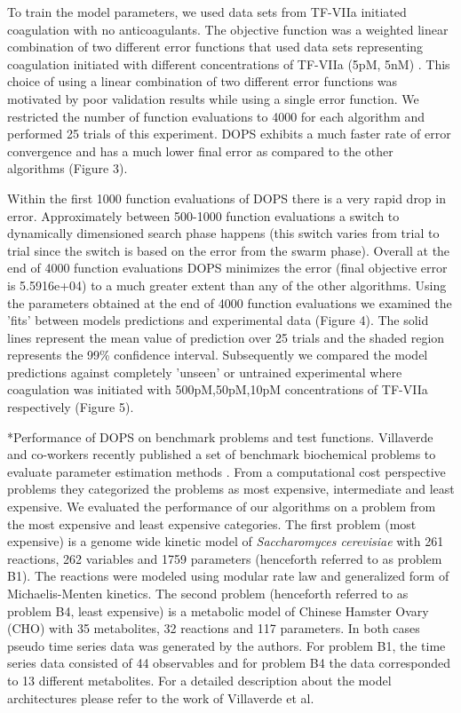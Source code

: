 \documentclass[12pt]{article}
\makeatletter
\renewcommand\subsection{\@startsection
	{subsection}{2}{0mm}
	{-0.05in}
	{-0.5\baselineskip}
	{\normalfont\normalsize\bfseries}}
\makeatother
\begin{document}
To train the model parameters, we used data sets from TF-VIIa initiated coagulation with no anticoagulants. The objective function was a weighted linear combination of two different error functions that used data sets representing coagulation initiated with different concentrations of TF-VIIa (5pM, 5nM) \cite{hockin2002model}. This choice of using a linear combination of two different error functions was motivated by poor validation results while using a single error function.  We restricted the number of function evaluations to 4000 for each algorithm and performed 25 trials of this experiment. DOPS exhibits a much faster rate of error convergence and has a much lower final error as compared to the other algorithms (Figure 3). 
 
 Within the first 1000 function evaluations  of DOPS there is a very rapid drop in error. Approximately between 500-1000 function evaluations a switch to dynamically dimensioned search phase happens (this switch varies from trial to trial since the switch is based on the error from the swarm phase). Overall at the end of 4000 function evaluations DOPS minimizes the error (final objective error is 5.5916e+04) to a much greater extent than any of the other algorithms. Using the parameters obtained at the end of 4000 function evaluations we examined the 'fits' between models predictions and experimental data (Figure 4). The solid lines represent the mean value of prediction over 25 trials and the shaded region represents the 99\% confidence interval. Subsequently we compared the model predictions against completely 'unseen' or untrained experimental where coagulation was initiated with 500pM,50pM,10pM concentrations of TF-VIIa respectively (Figure 5).

\subsection*{Performance of DOPS on benchmark problems and test functions.}
Villaverde and co-workers recently published a set of benchmark biochemical problems to evaluate parameter estimation methods \cite{villaverde2015biopredyn}. From a computational cost perspective problems they categorized the problems as most expensive, intermediate and least expensive. We evaluated the performance of our algorithms on a problem from the most expensive and least expensive categories. The first problem (most expensive) is a genome wide kinetic model of \textit{Saccharomyces cerevisiae} with 261 reactions, 262 variables and 1759 parameters (henceforth referred to as problem B1). The reactions were modeled using modular rate law and generalized form of Michaelis-Menten kinetics.   The second problem (henceforth referred to as problem B4, least expensive) is a metabolic model of Chinese Hamster Ovary (CHO) with 35 metabolites, 32 reactions and 117 parameters. In both cases pseudo time series data was generated by the authors.  For problem B1, the time series data consisted of 44 observables and for problem B4 the data corresponded to 13 different metabolites. For a detailed description about the model architectures please refer to the work of Villaverde et al. \cite{villaverde2015biopredyn}
\end{document}
